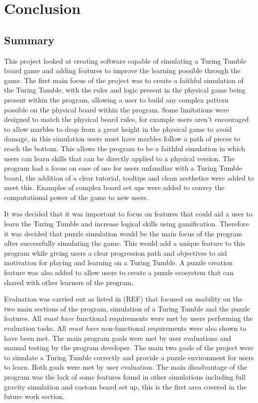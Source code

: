 \documentclass{l4proj}
\begin{document}
\chapter{Conclusion}
\section{Summary}
This project looked at creating software capable of simulating a Turing Tumble board game and adding features to improve the learning possible through the game. The first main focus of the project was to create a faithful simulation of the Turing Tumble, with the rules and logic present in the physical game being present within the program, allowing a user to build any complex pattern possible on the physical board within the program. Some limitations were designed to match the physical board rules, for example users aren't encouraged to allow marbles to drop from a great height in the physical game to avoid damage, in this simulation users must have marbles follow a path of pieces to reach the bottom. This allows the program to be a faithful simulation in which users can learn skills that can be directly applied to a physical version. The program had a focus on ease of use for users unfamiliar with a Turing Tumble board, the addition of a clear tutorial, tooltips and clean aesthetics were added to meet this. Examples of complex board set ups were added to convey the computational power of the game to new users. 

It was decided that it was important to focus on features that could aid a user to learn the Turing Tumble and increase logical skills using gamification. Therefore it was decided that puzzle simulation would be the main focus of the program after successfully simulating the game. This would add a unique feature to this program while giving users a clear progression path and objectives to aid motivation for playing and learning on a Turing Tumble. A puzzle creation feature was also added to allow users to create a puzzle ecosystem that can shared with other learners of the program. 

Evaluation was carried out as listed in (REF) that focused on usability on the two main sections of the program, simulation of a Turing Tumble and the puzzle features. All \emph{must have} functional requirements were met by users performing the evaluation tasks. All \emph{must have} non-functional requirements were also shown to have been met. The main program goals were met by user evaluations and manual testing by the program developer. The main two goals of the project were to simulate a Turing Tumble correctly and provide a puzzle environment for users to learn. Both goals were met by user evaluation. The main disadvantage of the program was the lack of some features found in other simulations including full gravity simulation and custom board set up, this is the first area covered in the future work section.
\end{document}
